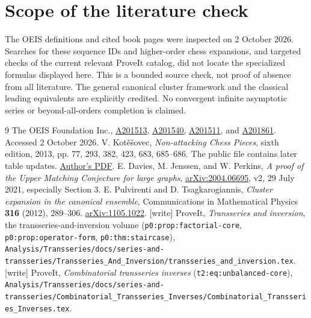 \documentclass[11pt]{article}
\begin{document}
\section*{Scope of the literature check}
The OEIS definitions and cited book pages were inspected on 2 October 2026. Searches for these sequence IDs and higher-order chess expansions, and targeted checks of the current relevant ProveIt catalog, did not locate the specialized formulas displayed here. This is a bounded source check, not proof of absence from all literature. The general canonical cluster framework and the classical leading equivalents are explicitly credited. No convergent infinite asymptotic series or beyond-all-orders completion is claimed.

\begingroup\raggedright
\begin{thebibliography}{9}
 The OEIS Foundation Inc.,
\href{https://oeis.org/A201513}{A201513},
\href{https://oeis.org/A201540}{A201540},
\href{https://oeis.org/A201511}{A201511}, and
\href{https://oeis.org/A201861}{A201861}. Accessed 2 October 2026.
 V. Kot\v e\v sovec, \emph{Non-attacking Chess Pieces}, sixth edition, 2013, pp. 77, 293, 382, 423, 683, 685--686. The public file contains later table updates.
\href{https://www.kotesovec.cz/books/kotesovec_non_attacking_chess_pieces_2013_6ed.pdf}{Author's PDF}.
 E. Davies, M. Jenssen, and W. Perkins,
\emph{A proof of the Upper Matching Conjecture for large graphs},
\href{https://arxiv.org/abs/2004.06695}{arXiv:2004.06695}, v2, 29 July 2021, especially Section 3.
 E. Pulvirenti and D. Tsagkarogiannis,
\emph{Cluster expansion in the canonical ensemble},
Communications in Mathematical Physics \textbf{316} (2012), 289--306.
\href{https://arxiv.org/abs/1105.1022}{arXiv:1105.1022}.
 [write] ProveIt, \emph{Transseries and inversion}, the
transseries-and-inversion volume (\texttt{p0:prop:factorial-core},
\texttt{p0:prop:operator-form}, \texttt{p0:thm:staircase}),
\nolinkurl{Analysis/Transseries/docs/series-and-transseries/Transseries_And_Inversion/transseries_and_inversion.tex}.
 [write] ProveIt, \emph{Combinatorial transseries
inverses} (\texttt{t2:eq:unbalanced-core}),
\nolinkurl{Analysis/Transseries/docs/series-and-transseries/Combinatorial_Transseries_Inverses/Combinatorial_Transseries_Inverses.tex}.
\end{thebibliography}
\endgroup
\end{document}
